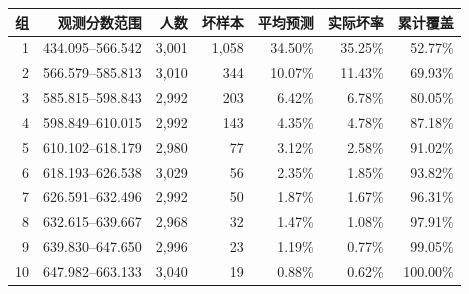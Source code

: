 \begin{tabular}{rrrrrrr}
\toprule
组 & 观测分数范围 & 人数 & 坏样本 & 平均预测 & 实际坏率 & 累计覆盖 \\
\midrule
1 & 434.095--566.542 & 3,001 & 1,058 & 34.50\% & 35.25\% & 52.77\% \\
2 & 566.579--585.813 & 3,010 & 344 & 10.07\% & 11.43\% & 69.93\% \\
3 & 585.815--598.843 & 2,992 & 203 & 6.42\% & 6.78\% & 80.05\% \\
4 & 598.849--610.015 & 2,992 & 143 & 4.35\% & 4.78\% & 87.18\% \\
5 & 610.102--618.179 & 2,980 & 77 & 3.12\% & 2.58\% & 91.02\% \\
6 & 618.193--626.538 & 3,029 & 56 & 2.35\% & 1.85\% & 93.82\% \\
7 & 626.591--632.496 & 2,992 & 50 & 1.87\% & 1.67\% & 96.31\% \\
8 & 632.615--639.667 & 2,968 & 32 & 1.47\% & 1.08\% & 97.91\% \\
9 & 639.830--647.650 & 2,996 & 23 & 1.19\% & 0.77\% & 99.05\% \\
10 & 647.982--663.133 & 3,040 & 19 & 0.88\% & 0.62\% & 100.00\% \\
\bottomrule
\end{tabular}
